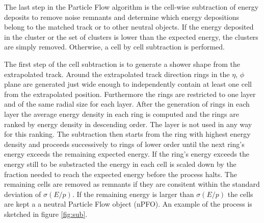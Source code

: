 The last step in the Particle Flow algorithm is the cell-wise subtraction of energy deposits to remove noise remnants and determine which energy depositions belong to the matched track or to other neutral objects.
If the energy deposited in the cluster or the set of clusters is lower than the expected energy, the clusters are simply removed. Otherwise, a cell by cell subtraction is performed.

The first step of the cell subtraction is to generate a shower shape from the extrapolated track. Around the extrapolated track direction rings in the $\eta$, $\phi$ plane are generated just wide enough to independently contain at least one cell from the extrapolated position. Furthermore the rings are restricted to one layer and of the same radial size for each layer.
After the generation of rings in each layer the average energy density in each ring is computed and the rings are ranked by energy density in descending order. The layer is not used in any way for this ranking.
The subtraction then starts from the ring with highest energy density and proceeds successively to rings of lower order until the next ring's energy exceeds the remaining expected energy.
If the ring's energy exceeds the energy still to be substracted the energy in each cell is scaled down by the fraction needed to reach the expected energy before the process halts. The remaining cells are removed as remnants if they are consitent within the standard deviation of $\sigma (E/p)$. If the remaining energy is larger than $\sigma (E/p)$ the cells are kept a a neutral Particle Flow object (nPFO).
An example of the process is sketched in figure \ref{fig:sub}. 




